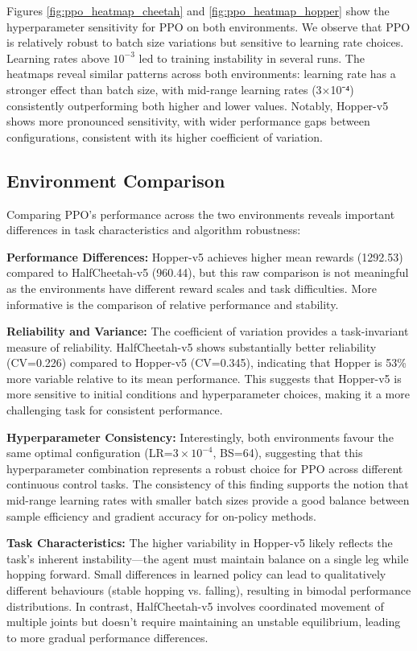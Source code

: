 \documentclass[12pt,a4paper]{report}
\begin{document}
Figures \ref{fig:ppo_heatmap_cheetah} and \ref{fig:ppo_heatmap_hopper} show the hyperparameter sensitivity for PPO on both environments. We observe that PPO is relatively robust to batch size variations but sensitive to learning rate choices. Learning rates above $10^{-3}$ led to training instability in several runs. The heatmaps reveal similar patterns across both environments: learning rate has a stronger effect than batch size, with mid-range learning rates (3×10⁻⁴) consistently outperforming both higher and lower values. Notably, Hopper-v5 shows more pronounced sensitivity, with wider performance gaps between configurations, consistent with its higher coefficient of variation.

\subsection{Environment Comparison}

Comparing PPO's performance across the two environments reveals important differences in task characteristics and algorithm robustness:

\textbf{Performance Differences:} Hopper-v5 achieves higher mean rewards (1292.53) compared to HalfCheetah-v5 (960.44), but this raw comparison is not meaningful as the environments have different reward scales and task difficulties. More informative is the comparison of relative performance and stability.

\textbf{Reliability and Variance:} The coefficient of variation provides a task-invariant measure of reliability. HalfCheetah-v5 shows substantially better reliability (CV=0.226) compared to Hopper-v5 (CV=0.345), indicating that Hopper is 53\% more variable relative to its mean performance. This suggests that Hopper-v5 is more sensitive to initial conditions and hyperparameter choices, making it a more challenging task for consistent performance.

\textbf{Hyperparameter Consistency:} Interestingly, both environments favour the same optimal configuration (LR=$3\times10^{-4}$, BS=64), suggesting that this hyperparameter combination represents a robust choice for PPO across different continuous control tasks. The consistency of this finding supports the notion that mid-range learning rates with smaller batch sizes provide a good balance between sample efficiency and gradient accuracy for on-policy methods.

\textbf{Task Characteristics:} The higher variability in Hopper-v5 likely reflects the task's inherent instability—the agent must maintain balance on a single leg while hopping forward. Small differences in learned policy can lead to qualitatively different behaviours (stable hopping vs. falling), resulting in bimodal performance distributions. In contrast, HalfCheetah-v5 involves coordinated movement of multiple joints but doesn't require maintaining an unstable equilibrium, leading to more gradual performance differences.
\end{document}
